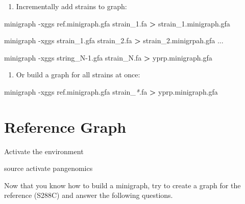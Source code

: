 \documentclass[
]{book}
\newenvironment{Shaded}{\begin{snugshade}}{\end{snugshade}}
\newcommand{\AttributeTok}[1]{\textcolor[rgb]{0.77,0.63,0.00}{#1}}
\newcommand{\BuiltInTok}[1]{#1}
\newcommand{\ExtensionTok}[1]{#1}
\newcommand{\NormalTok}[1]{#1}
\newcommand{\OperatorTok}[1]{\textcolor[rgb]{0.81,0.36,0.00}{\textbf{#1}}}
\newcommand{\PreprocessorTok}[1]{\textcolor[rgb]{0.56,0.35,0.01}{\textit{#1}}}
\providecommand{\tightlist}{%
  \setlength{\itemsep}{0pt}\setlength{\parskip}{0pt}}
\begin{document}
\begin{enumerate}
\def\labelenumi{\arabic{enumi}.}
\setcounter{enumi}{1}
\tightlist
\item
  Incrementally add strains to graph:
\end{enumerate}

\begin{Shaded}
\begin{Highlighting}[]
\ExtensionTok{minigraph} \AttributeTok{{-}xggs}\NormalTok{ ref.minigraph.gfa strain\_1.fa }\OperatorTok{\textgreater{}}\NormalTok{ strain\_1.minigraph.gfa}

\ExtensionTok{minigraph} \AttributeTok{{-}xggs}\NormalTok{ strain\_1.gfa strain\_2.fa }\OperatorTok{\textgreater{}}\NormalTok{ strain\_2.minigrpah.gfa}
\ExtensionTok{...}

\ExtensionTok{minigraph} \AttributeTok{{-}xggs}\NormalTok{ string\_N{-}1.gfa strain\_N.fa }\OperatorTok{\textgreater{}}\NormalTok{ yprp.minigraph.gfa}
\end{Highlighting}
\end{Shaded}

\begin{enumerate}
\def\labelenumi{\arabic{enumi}.}
\setcounter{enumi}{2}
\tightlist
\item
  Or build a graph for all strains at once:
\end{enumerate}

\begin{Shaded}
\begin{Highlighting}[]
\ExtensionTok{minigraph} \AttributeTok{{-}xggs}\NormalTok{ ref.minigraph.gfa strain\_}\PreprocessorTok{*}\NormalTok{.fa }\OperatorTok{\textgreater{}}\NormalTok{ yprp.minigraph.gfa}
\end{Highlighting}
\end{Shaded}

\hypertarget{reference-graph}{%
\section{Reference Graph}\label{reference-graph}}

Activate the environment

\begin{Shaded}
\begin{Highlighting}[]
\BuiltInTok{source}\NormalTok{ activate pangenomics}
\end{Highlighting}
\end{Shaded}

Now that you know how to build a minigraph, try to create a graph for the reference (S288C) and answer the following questions.
\end{document}
